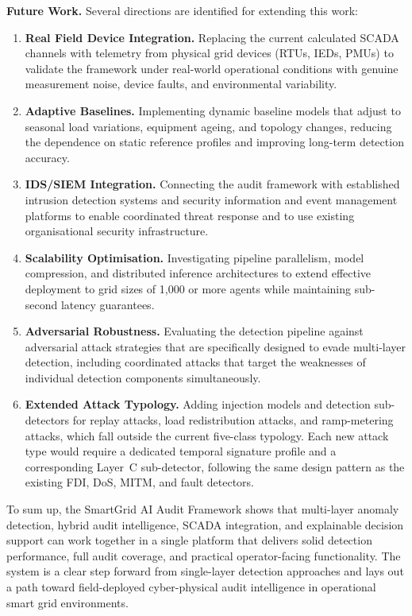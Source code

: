 \noindent
\textbf{Future Work.}
Several directions are identified for extending this work:

\begin{enumerate}
    \item \textbf{Real Field Device Integration.} Replacing the current calculated SCADA channels with telemetry from physical grid devices (RTUs, IEDs, PMUs) to validate the framework under real-world operational conditions with genuine measurement noise, device faults, and environmental variability.

    \item \textbf{Adaptive Baselines.} Implementing dynamic baseline models that adjust to seasonal load variations, equipment ageing, and topology changes, reducing the dependence on static reference profiles and improving long-term detection accuracy.

    \item \textbf{IDS/SIEM Integration.} Connecting the audit framework with established intrusion detection systems and security information and event management platforms to enable coordinated threat response and to use existing organisational security infrastructure.

    \item \textbf{Scalability Optimisation.} Investigating pipeline parallelism, model compression, and distributed inference architectures to extend effective deployment to grid sizes of 1,000 or more agents while maintaining sub-second latency guarantees.

    \item \textbf{Adversarial Robustness.} Evaluating the detection pipeline against adversarial attack strategies that are specifically designed to evade multi-layer detection, including coordinated attacks that target the weaknesses of individual detection components simultaneously.

    \item \textbf{Extended Attack Typology.} Adding injection models and detection sub-detectors for replay attacks, load redistribution attacks, and ramp-metering attacks, which fall outside the current five-class typology. Each new attack type would require a dedicated temporal signature profile and a corresponding Layer~C sub-detector, following the same design pattern as the existing FDI, DoS, MITM, and fault detectors.
\end{enumerate}

\par \vspace{0.35cm}

\noindent
To sum up, the SmartGrid AI Audit Framework shows that multi-layer anomaly detection, hybrid audit intelligence, SCADA integration, and explainable decision support can work together in a single platform that delivers solid detection performance, full audit coverage, and practical operator-facing functionality. The system is a clear step forward from single-layer detection approaches and lays out a path toward field-deployed cyber-physical audit intelligence in operational smart grid environments.
